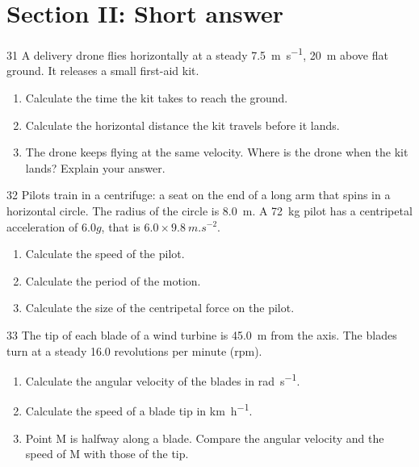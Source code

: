 \section*{Section II: Short answer}

\begin{practiceq}{3}{1}\label{pq:drone}
A delivery drone flies horizontally at a steady \qty{7.5}{m.s^{-1}}, \qty{20}{m} above flat
ground. It releases a small first-aid kit.
\begin{enumerate}[label=(\alph*)]
  \item Calculate the time the kit takes to reach the ground. 
  \item Calculate the horizontal distance the kit travels before it lands. 
  \item The drone keeps flying at the same velocity. Where is the drone when the kit lands?
        Explain your answer. 
\end{enumerate}
\end{practiceq}

\begin{practiceq}{3}{2}\label{pq:centrifuge}
Pilots train in a centrifuge: a seat on the end of a long arm that spins in a horizontal
circle. The radius of the circle is \qty{8.0}{m}. A \qty{72}{kg} pilot has a centripetal
acceleration of $6.0g$, that is $6.0 \times \qty{9.8}{m.s^{-2}}$.
\begin{enumerate}[label=(\alph*)]
  \item Calculate the speed of the pilot. 
  \item Calculate the period of the motion. 
  \item Calculate the size of the centripetal force on the pilot. 
\end{enumerate}
\end{practiceq}

\begin{practiceq}{3}{3}\label{pq:turbine}
The tip of each blade of a wind turbine is \qty{45.0}{m} from the axis. The blades turn at a
steady 16.0 revolutions per minute (rpm).
\begin{enumerate}[label=(\alph*)]
  \item Calculate the angular velocity of the blades in \si{rad.s^{-1}}. 
  \item Calculate the speed of a blade tip in \si{km.h^{-1}}. 
  \item Point M is halfway along a blade. Compare the angular velocity and the speed of M with
        those of the tip. 
\end{enumerate}
\end{practiceq}

